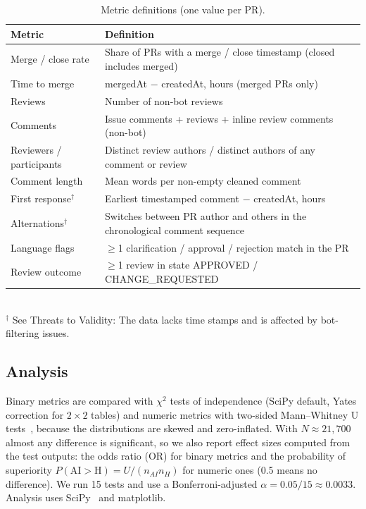 \documentclass[conference]{IEEEtran}
\begin{document}
\begin{table}[t]
\caption{Metric definitions (one value per PR).}
\label{tab:metrics}
\centering\small
\begin{tabular}{@{}p{0.95in}p{2.4in}@{}}
\toprule
Metric & Definition \\
\midrule
Merge / close rate & Share of PRs with a merge / close timestamp (closed includes merged) \\
Time to merge & mergedAt $-$ createdAt, hours (merged PRs only) \\
Reviews & Number of non-bot reviews \\
Comments & Issue comments + reviews + inline review comments (non-bot) \\
Reviewers / participants & Distinct review authors / distinct authors of any comment or review \\
Comment length & Mean words per non-empty cleaned comment \\
First response$^\dagger$ & Earliest timestamped comment $-$ createdAt, hours \\
Alternations$^\dagger$ & Switches between PR author and others in the chronological comment sequence \\
Language flags & $\geq$1 clarification / approval / rejection match in the PR \\
Review outcome & $\geq$1 review in state APPROVED / CHANGE\_REQUESTED\\
\bottomrule
\end{tabular}
\\[2pt]\footnotesize $^\dagger$ See Threats to Validity:  The data lacks time stamps and is affected by bot-filtering issues. 
\end{table}

\subsection{Analysis}
Binary metrics are compared with $\chi^2$ tests of independence (SciPy default, Yates correction for $2{\times}2$ tables) and numeric metrics with two-sided Mann--Whitney U tests~\cite{mannwhitney}, because the distributions are skewed and zero-inflated. With $N\approx 21{,}700$ almost any difference is significant, so we also report effect sizes computed from the test outputs: the odds ratio (OR) for binary metrics and the probability of superiority $P(\mathrm{AI}{>}\mathrm{H})=U/(n_{AI}n_{H})$ for numeric ones (0.5 means no difference). We run 15 tests and use a Bonferroni-adjusted $\alpha=0.05/15\approx0.0033$. Analysis uses SciPy~\cite{scipy} and matplotlib.
\end{document}
